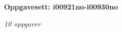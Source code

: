 \centerline{\bf Oppgavesett: i00921no-i00930no}
\vskip 10pt
\centerline{\it 10 oppgaver}\vskip 10pt
\vskip 10pt
